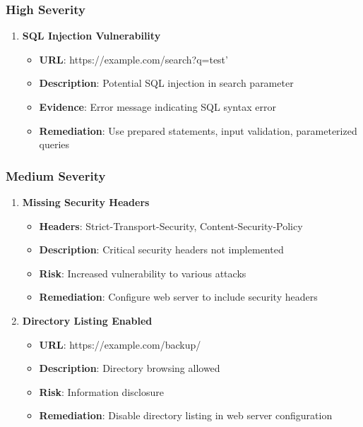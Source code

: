 \documentclass[12pt,a4paper]{report}
\begin{document}
\subsubsection{High Severity}

\begin{enumerate}
    \item \textbf{SQL Injection Vulnerability}
    \begin{itemize}
        \item \textbf{URL}: https://example.com/search?q=test'
        \item \textbf{Description}: Potential SQL injection in search parameter
        \item \textbf{Evidence}: Error message indicating SQL syntax error
        \item \textbf{Remediation}: Use prepared statements, input validation, parameterized queries
    \end{itemize}
\end{enumerate}

\subsubsection{Medium Severity}

\begin{enumerate}
    \item \textbf{Missing Security Headers}
    \begin{itemize}
        \item \textbf{Headers}: Strict-Transport-Security, Content-Security-Policy
        \item \textbf{Description}: Critical security headers not implemented
        \item \textbf{Risk}: Increased vulnerability to various attacks
        \item \textbf{Remediation}: Configure web server to include security headers
    \end{itemize}
    
    \item \textbf{Directory Listing Enabled}
    \begin{itemize}
        \item \textbf{URL}: https://example.com/backup/
        \item \textbf{Description}: Directory browsing allowed
        \item \textbf{Risk}: Information disclosure
        \item \textbf{Remediation}: Disable directory listing in web server configuration
    \end{itemize}
\end{enumerate}
\end{document}
